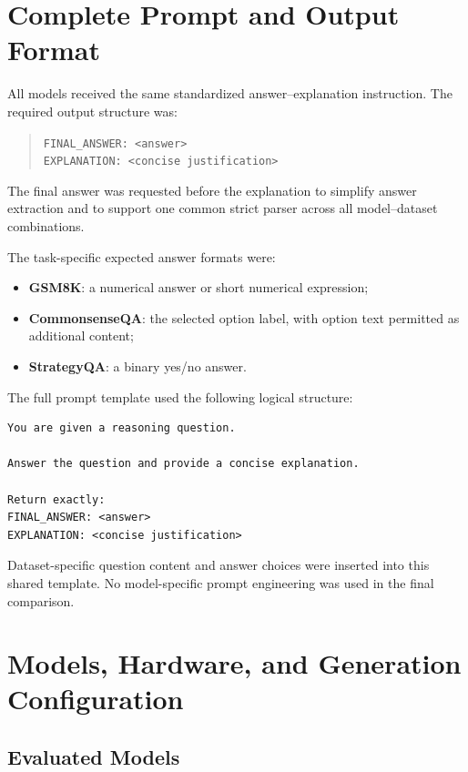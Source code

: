 \appendix

\section{Complete Prompt and Output Format}
\label{app:prompt}

All models received the same standardized answer--explanation instruction.
The required output structure was:

\begin{quote}
\texttt{FINAL\_ANSWER: <answer>}\\
\texttt{EXPLANATION: <concise justification>}
\end{quote}

The final answer was requested before the explanation to simplify answer
extraction and to support one common strict parser across all model--dataset
combinations.

The task-specific expected answer formats were:

\begin{itemize}
    \item \textbf{GSM8K}: a numerical answer or short numerical expression;
    \item \textbf{CommonsenseQA}: the selected option label, with option text
    permitted as additional content;
    \item \textbf{StrategyQA}: a binary yes/no answer.
\end{itemize}

The full prompt template used the following logical structure:

\begin{verbatim}
You are given a reasoning question.

Answer the question and provide a concise explanation.

Return exactly:
FINAL_ANSWER: <answer>
EXPLANATION: <concise justification>
\end{verbatim}

Dataset-specific question content and answer choices were inserted into this
shared template. No model-specific prompt engineering was used in the final
comparison.

\section{Models, Hardware, and Generation Configuration}
\label{app:configuration}

\subsection{Evaluated Models}

